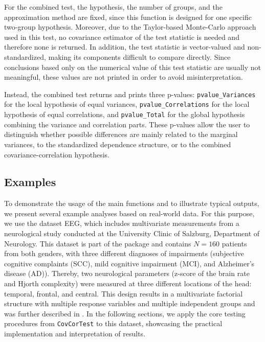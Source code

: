 For the combined test, the hypothesis, the number of groups, and the
approximation method are fixed, since this function is designed for one specific
two-group hypothesis. Moreover, due to the Taylor-based Monte-Carlo approach
used in this test, no covariance estimator of the test statistic is needed and
therefore none is returned. In addition, the test statistic is vector-valued and
non-standardized, making its components difficult to compare directly. Since
conclusions based only on the numerical value of this test statistic are usually
not meaningful, these values are not printed in order to avoid
misinterpretation.

Instead, the combined test returns and prints three p-values:
\texttt{pvalue\_Variances} for the local hypothesis of equal variances,
\texttt{pvalue\_Correlations} for the local hypothesis of equal correlations, and
\texttt{pvalue\_Total} for the global hypothesis combining the variance and correlation
parts. These p-values allow the user to distinguish whether possible differences
are mainly related to the marginal variances, to the standardized dependence
structure, or to the combined covariance-correlation hypothesis.

\subsection{Examples}\label{examples}

To demonstrate the usage of the main functions and to illustrate typical
outputs, we present several example analyses based on real-world data. For this
purpose, we use the dataset EEG, which includes multivariate measurements from
a neurological study conducted at the University Clinic of Salzburg, Department
of Neurology. This dataset is part of the  package
\citep{Friedrich2019} and contains \(N = 160\) patients from both genders,
with three different diagnoses of impairments (subjective cognitive complaints
(SCC), mild cognitive impairment (MCI), and Alzheimer's disease (AD)). Thereby,
two neurological parameters (z-score of the brain rate and Hjorth complexity)
were measured at three different locations of the head: temporal, frontal, and
central. This design results in a multivariate factorial structure with multiple
response variables and multiple independent groups and was further described in
\citet{bathke2018}. In the following sections, we apply the core testing
procedures from \texttt{CovCorTest} to this dataset, showcasing the practical
implementation and interpretation of results.

